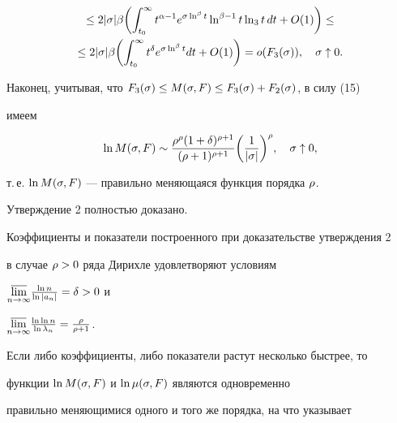 \begin{pf}
\begin{multline*}
\le 2|\s|\be\biggl(\int_{t_0}^\i t^{\a-1} e^{\s\ln^\be


t}\ln^{\be-1}t\ln_3t\,dt+O(1)\biggr)\le\\


\le 2|\s|\be\biggl(\int_{t_0}^\i t^{\d} e^{\s\ln^\be t}dt+O(1)\biggr)=


o(F_3(\s)), \quad\s\uparrow 0. 


\end{multline*}





Наконец, учитывая, что $F_3(\sigma)\le M(\sigma,F)\le F_3(\sigma)+F_2(\sigma)$, в силу (15) 


имеем


$$


\ln M(\s,F)\sim\frac{\r^\r(1+\d)^{\r+1}}{(\r+1)^{\r+1}}


\biggl(\frac1{|\s|}\biggr)^{\r},\quad\s\uparrow 0,


$$


т.\,е. $\ln M(\sigma,F)$ --- правильно меняющаяся функция порядка $\rho$. 


Утверждение 2 полностью доказано.


\end{pf}





Коэффициенты и показатели построенного при доказательстве утверждения 2


в случае $\rho>0$ ряда Дирихле удовлетворяют условиям 


$\underset{n\to\infty}\varlimsup{}\frac{\ln n}{\ln |a_n|}=\delta>0$ и


$\underset{n\to\infty}\varlimsup{}\frac{\ln\ln n}{\ln \lambda_n}=\frac{\rho}{\rho+1}$.


Если либо коэффициенты, либо показатели растут несколько быстрее, то


функции $\ln M(\sigma,F)$ и $\ln \mu(\sigma,F)$ являются одновременно


правильно меняющимися одного и того же порядка, на что указывает





